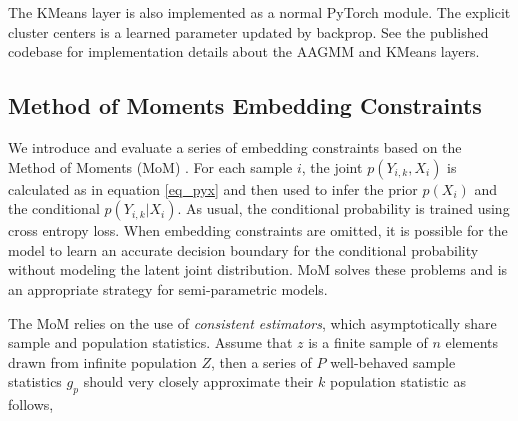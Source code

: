 \documentclass[10pt,twocolumn,letterpaper]{article}
\begin{document}

The KMeans layer is also implemented as a normal PyTorch \cite{pytorch} module.
The explicit cluster centers is a learned parameter updated by backprop.
See the published codebase for implementation details about the AAGMM and KMeans layers.


\subsection{Method of Moments Embedding Constraints}
\label{sec:mom}

We introduce and evaluate a series of embedding constraints based on the Method of Moments (MoM) \cite{pearson1936method}.  
For each sample $i$, the joint $p(Y_{i,k},X_i)$ is calculated as in equation \ref{eq_pyx} and then used to infer the prior $p(X_i)$ and the conditional $p(Y_{i,k}|X_i)$.
As usual, the conditional probability is trained using cross entropy loss.  
When embedding constraints are omitted, it is possible for the model to learn an accurate decision boundary for the conditional probability without modeling the latent joint distribution.
MoM solves these problems and is an appropriate strategy for semi-parametric models.

The MoM relies on the use of \textit{consistent estimators}, which asymptotically share sample and population statistics.
Assume that $z$ is a finite sample of $n$ elements drawn from infinite population $Z$, then a series of $P$ well-behaved sample statistics $g_p$ should very closely approximate their $k$ population statistic as follows,
\end{document}
